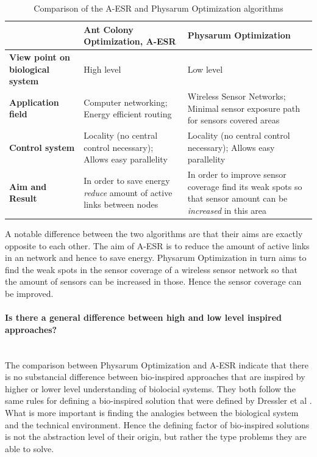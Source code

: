 \documentclass[cameraready]{IWORK2014}
\begin{document}
\begin{table}
    \centering
	\begin{tabularx}{0.90\textwidth}{|X|X|X|}
		\hline & \textbf{Ant Colony Optimization, A-ESR} & \textbf{Physarum Optimization} \\ \hline
		\textbf{View point on biological system} & High level & Low level \\ \hline
		\textbf{Application field} & Computer networking; Energy efficient routing & Wireless Sensor Networks; Minimal sensor exposure path for sensors covered areas \\ 	\hline
		\textbf{Control system} & Locality (no central control necessary); Allows easy parallelity & Locality (no central control necessary); Allows easy parallelity \\ \hline
		\textbf{Aim and Result} & In order to save energy \textit{reduce} amount of active links between nodes & In order to improve sensor coverage find its weak spots so that sensor amount can be \textit{increased} in this area \\ \hline
	\end{tabularx}
	\caption{Comparison of the A-ESR and Physarum Optimization algorithms}
	\label{tbl:aco-po-comparison}
\end{table}

A notable difference between the two algorithms are that their aims are exactly opposite to each other. The aim of A-ESR is to reduce the amount of active links in an network and hence to save energy. Physarum Optimization in turn aims to find the weak spots in the sensor coverage of a wireless sensor network so that the amount of sensors can be increased in those. Hence the sensor coverage can be improved.

\paragraph{Is there a general difference between high and low level inspired approaches?}~\\
The comparison between Physarum Optimization and A-ESR indicate that there is no substancial difference between bio-inspired approaches that are inspired by higher or lower level understanding of biolocial systems. They both follow the same rules for defining a bio-inspired solution that were defined by Dressler et al \cite{dressler2010bio}. What is more important is finding the analogies between the biological system and the technical environment. Hence the defining factor of bio-inspired solutions is not the abstraction level of their origin, but rather the type problems they are able to solve.
\end{document}
